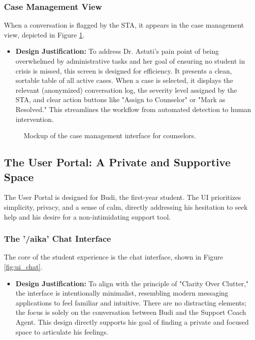 \subsubsection{Case Management View}
When a conversation is flagged by the STA, it appears in the case management view, depicted in Figure \ref{fig:ui_case_management}.
\begin{itemize}
    \item \textbf{Design Justification:} To address Dr. Astuti's pain point of being overwhelmed by administrative tasks and her goal of ensuring no student in crisis is missed, this screen is designed for efficiency. It presents a clean, sortable table of all active cases. When a case is selected, it displays the relevant (anonymized) conversation log, the severity level assigned by the STA, and clear action buttons like "Assign to Counselor" or "Mark as Resolved." This streamlines the workflow from automated detection to human intervention.
\end{itemize}

\begin{figure}[h]
    \centering
    \caption{Mockup of the case management interface for counselors.}
    \label{fig:ui_case_management}
\end{figure}

\subsection{The User Portal: A Private and Supportive Space}

The User Portal is designed for Budi, the first-year student. The UI prioritizes simplicity, privacy, and a sense of calm, directly addressing his hesitation to seek help and his desire for a non-intimidating support tool.

\subsubsection{The '/aika' Chat Interface}
The core of the student experience is the chat interface, shown in Figure \ref{fig:ui_chat}.
\begin{itemize}
    \item \textbf{Design Justification:} To align with the principle of "Clarity Over Clutter," the interface is intentionally minimalist, resembling modern messaging applications to feel familiar and intuitive. There are no distracting elements; the focus is solely on the conversation between Budi and the Support Coach Agent. This design directly supports his goal of finding a private and focused space to articulate his feelings.
\end{itemize}

